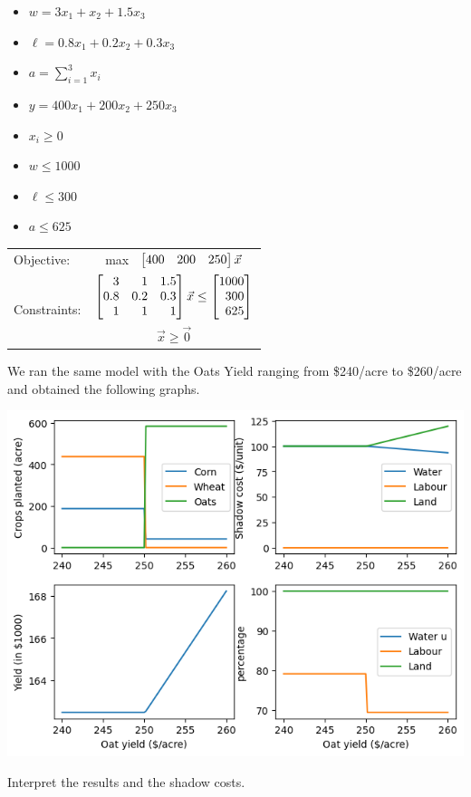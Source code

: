\documentclass{workbook}
\begin{document}
\begin{solution}
\begin{slide}
\begin{parts}
	\item
		\begin{itemize}
			\item $w = 3x_1 + x_2 + 1.5 x_3$
			\item $\ell = 0.8 x_1 + 0.2 x_2 + 0.3 x_3$
			\item $\displaystyle a = \sum_{i=1}^3 x_i$
			\item $y = 400 x_1 + 200 x_2 + 250 x_3$
		\end{itemize}
		
	\item 
		\begin{itemize}
			\item $x_i \geq 0$
			\item $w \leq 1000$
			\item $\ell \leq 300$
			\item $a \leq 625$
		\end{itemize}
	\item 	\begin{tabular}[t]{lc}
				Objective: 						& max \ $\mat{400 & 200 & 250} \vec{x}$ \\
				\multirow{2}{*}{Constraints:} 	& $\mat{3 & 1 & 1.5\\0.8 & 0.2 & 0.3\\1 & 1 & 1} \vec{x} \leq \mat{1000\\300\\625}$ \\
							& $\vec{x} \geq \vec{0}$
			\end{tabular}
\end{parts}
\end{slide}
\end{solution}

\begin{slide}

We ran the same model with the Oats Yield ranging from \$240/acre to \$260/acre and obtained the following graphs.
\begin{center}
	\includegraphics[width=.5\textwidth]{images/farm-linearprog.png}
\end{center}

\begin{parts}
	\setcounter{partsitem}{4}
	\item Interpret the results and the shadow costs.
\end{parts}
\end{slide}
\end{document}

